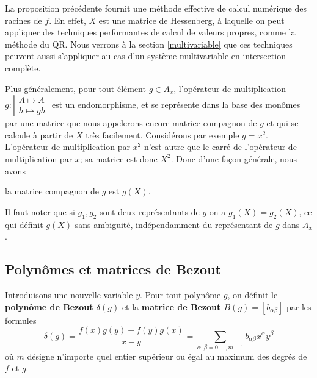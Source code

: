 \documentclass{standalone}
\begin{document}
  \begin{rem}
  La proposition précédente fournit une méthode effective de calcul numérique des racines de $f$. En effet, $X$ est une matrice de Hessenberg, à laquelle on peut appliquer des techniques performantes de calcul de valeurs propres, comme la méthode du QR. Nous verrons à la section \ref{multivariable} que ces techniques peuvent aussi s'appliquer au cas d'un système multivariable en intersection complète.
  \end{rem}
  Plus généralement, pour tout élément $g\in A_x$, l'opérateur de multiplication
  $g : \left\vert
  \begin{array}{c}
  A \mapsto A \\
  h \mapsto gh
  \end{array}
  \right.$
  est un endomorphisme, et se représente dans la base des monômes par une matrice que nous appelerons encore matrice compagnon de $g$ et qui se calcule à partir de $X$ très facilement. Considérons par exemple $g = x^2$. L'opérateur de multiplication par $x^2$ n'est autre que le carré de l'opérateur de multiplication par $x$; sa matrice est donc $X^2$. Donc d'une façon générale, nous avons
  \begin{prop}
  la matrice compagnon de $g$ est $g(X)$.
  \end{prop}

  \begin{rem}
  Il faut noter que si $g_1, g_2$ sont deux représentants de $g$ on a $g_1(X) = g_2(X)$, ce qui définit $g(X)$ sans ambiguité, indépendamment du représentant de $g$ dans $A_x$.
  \end{rem}

  \subsection{Polynômes et matrices de Bezout}
  \begin{defn}
  \label{def_bez}
  Introduisons une nouvelle variable $y$.
  Pour tout polynôme $g$, on définit le {\bf polynôme de Bezout $\delta(g)$} et la {\bf matrice de Bezout $B(g) = [b_{\alpha\beta}]$}  par les formules
  \begin{equation}
  \delta(g) = \dfrac{f(x)g(y)-f(y)g(x)}{x-y} = \sum_{\alpha,\beta = 0, \cdots, m-1} b_{\alpha\beta} x^\alpha y^\beta
  \end{equation}
  où $m$ désigne n'importe quel entier supérieur ou égal au maximum des degrés de $f$ et $g$.
  \end{defn}
\end{document}
